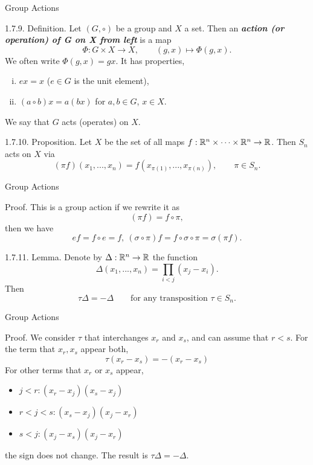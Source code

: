 \documentclass[hyperref={pdfpagelabels=true}]{beamer}
\newcommand{\highlightg}[1]{\textcolor[rgb]{0.1,0.5,0.3}{\emph{\textbf{#1}}}}
\newcommand{\<}{\langle}
\renewcommand{\>}{\rangle}
\begin{document}
    \begin{frame}{Group Actions}
        \begin{block}{1.7.9. Definition.} Let $(G,\circ)$ be a group and $X$ a set. Then an \highlightg{action (or operation) of G on X from left} is a map
            \[\Phi:G \times X \rightarrow X, \qquad (g,x) \mapsto \Phi(g,x).\]
            We often write $\Phi(g,x) = gx$.
            It has properties,
            \begin{enumerate}[(i)]
                \item $ex = x$ ($e \in G$ is the unit element),
                \item $(a \circ b)x = a(bx)$ for $a,b \in G$, $x \in X$.
            \end{enumerate}
            We say that $G$ acts (operates) on $X$.
        \end{block}
        \begin{block}{1.7.10. Proposition.}
            Let $X$ be the set of all maps $f:\mathbb{R}^{n} \times \cdots \times \mathbb{R}^{n} \rightarrow \mathbb{R}$. Then $S_{n}$ acts on $X$ via 
            \[(\pi f)(x_{1},...,x_{n}) = f(x_{\pi(1)},...,x_{\pi(n)}), \qquad \pi \in S_{n}.\]
        \end{block}
    \end{frame}
    \begin{frame}{Group Actions}
        \begin{block}{Proof.}
            This is a group action if we rewrite it as 
            \[(\pi f) = f \circ \pi,\]
            then we have 
            \[ef = f \circ e = f,\ (\sigma \circ \pi) f = f \circ \sigma \circ \pi = \sigma(\pi f).\]
        \end{block}
        \begin{block}{1.7.11. Lemma.}
            Denote by $\Delta:\mathbb{R}^{n} \rightarrow \mathbb{R}$ the function
            \[\Delta(x_{1},...,x_{n}) = \prod_{i<j}(x_{j}-x_{i}).\]
            Then
            \[\tau\Delta = -\Delta \qquad \text{for any transposition }\tau \in S_{n}.\]
        \end{block}
    \end{frame}
    \begin{frame}{Group Actions}
        \begin{block}{Proof.}
            We consider $\tau$ that interchanges $x_{r}$ and $x_{s}$, and can assume that $r<s$. For the term that $x_r,x_s$ appear both,
            \[\tau(x_{r}-x_{s}) = -(x_{r}-x_{s})\]
            For other terms that $x_{r}$ or $x_{s}$ appear,
            \begin{itemize}
                \item $j<r:(x_{r}-x_{j})(x_{s}-x_{j})$
                \item $r<j<s:(x_{s}-x_{j})(x_{j}-x_{r})$
                \item $s<j:(x_{j}-x_{s})(x_{j}-x_{r})$
            \end{itemize}
            the sign does not change. The result is $\tau\Delta = -\Delta$.
        \end{block}
    \end{frame}
\end{document}
